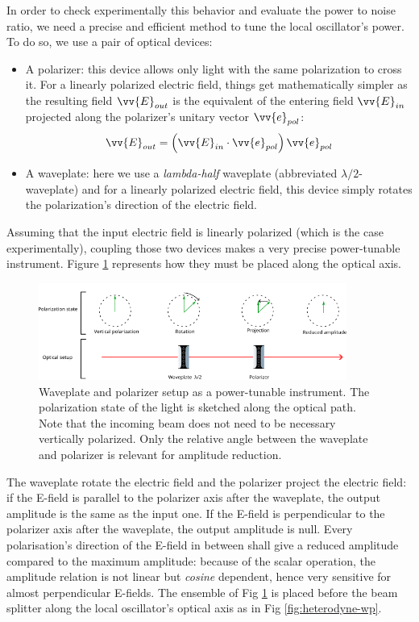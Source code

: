 \documentclass[11pt]{report}
\begin{document}
In order to check experimentally this behavior and evaluate the power to noise ratio, we need a precise and efficient method to tune the local oscillator's power. To do so, we use a pair of optical devices:
\begin{itemize}
	\item A polarizer: this device allows only light with the same polarization to cross it. For a linearly polarized electric field, things get mathematically simpler as the resulting field $\vv{E}_{out}$ is the equivalent of the entering field $\vv{E}_{in}$ projected along the polarizer's unitary vector $\vv{e}_{pol}$:
	\begin{equation}
	\vv{E}_{out} = \left( \vv{E}_{in} \cdot \vv{e}_{pol} \right) \vv{e}_{pol}
	\end{equation}
	\item A waveplate: here we use a \textit{lambda-half} waveplate (abbreviated $\lambda/2$-waveplate) and for a linearly polarized electric field, this device simply rotates the polarization's direction of the electric field.  
\end{itemize}

Assuming that the input electric field is linearly polarized (which is the case experimentally), coupling those two devices makes a very precise power-tunable instrument. Figure \ref{fig:wp-pol-setup} represents how they must be placed along the optical axis.

\begin{figure}[h!]
\centering
\includegraphics[width=0.9\textwidth]{wp-pol-setup}
\caption{Waveplate and polarizer setup as a power-tunable instrument. The polarization state of the light is sketched along the optical path. Note that the incoming beam does not need to be necessary vertically polarized. Only the relative angle between the waveplate and polarizer is relevant for amplitude reduction.}
\label{fig:wp-pol-setup}
\end{figure}

The waveplate rotate the electric field and the polarizer project the electric field: if the E-field is parallel to the polarizer axis after the waveplate, the output amplitude is the same as the input one. If the E-field is perpendicular to the polarizer axis after the waveplate, the output amplitude is null. Every polarisation's direction of the E-field in between shall give a reduced amplitude compared to the maximum amplitude: because of the scalar operation, the amplitude relation is not linear but \textit{cosine} dependent, hence very sensitive for almost perpendicular E-fields. The ensemble of Fig \ref{fig:wp-pol-setup} is placed before the beam splitter along the local oscillator's optical axis as in Fig \ref{fig:heterodyne-wp}.
\end{document}
